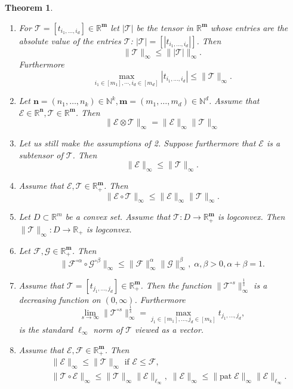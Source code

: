 \documentclass{amsart}
\newcommand{\N}{\mathbb{N}}
\newcommand{\R}{\mathbb{R}}
\newcommand{\m}{\mathbf{m}}
\newcommand{\n}{\mathbf{n}}
\newcommand{\0}{\mathbf{0}}
\newcommand{\1}{\mathbf{1}}
\newcommand{\cE}{\mathcal{E}}
\newcommand{\cF}{\mathcal{F}}
\newcommand{\cG}{\mathcal{G}}
\newcommand{\cT}{\mathcal{T}}
\newcommand{\pat}{\mathrm{pat}\;}
\newtheorem{theorem}[theo]{Theorem}
\theoremstyle{remark}
\numberwithin{equation}{section} %
\renewcommand{\le}{\leqslant}
\begin{document}
\begin{theorem}\label{logconspecnrm}   $\;$
\begin{enumerate}
\item For $\cT=[t_{i_1,\ldots,i_d}]\in\R^{\m}$ let $|\cT|$ be the tensor in $\R^{\m}$ whose entries are the absolute value of the entries $\cT$: $|\cT|=[|t_{i_1,\ldots,i_d}|]$.
Then
\begin{equation}\label{absdomin}
\|\cT\|_{\infty}\le \||\cT|\|_{\infty}.
\end{equation}
Furthermore
\begin{equation}\label{lowbndspecnrm}
\max_{i_1\in[m_1],\cdots,i_d\in[m_d]}|t_{i_1,\ldots,i_d}|\le \|\cT\|_{\infty}.
\end{equation}
\item Let $\n=(n_1,\ldots,n_k)\in\N^k, \m=(m_1,\ldots,m_d)\in\N^d$.  Assume that $\cE\in\R^{\n}, \cT\in\R^{\m}$.  Then
\begin{equation}\label{specnrmtenprod}
\|\cE\otimes \cT\|_{\infty}=\|\cE\|_{\infty}\|\cT\|_{\infty}
\end{equation}
\item Let us still make the assumptions of \emph{2}.  Suppose furthermore that $\cE$ is a subtensor of $\cT$.  
Then
\begin{equation}\label{subtenin}
\|\cE\|_{\infty}\le\|\cT\|_{\infty}.
\end{equation}
\item Assume that $\cE,\cT\in\R^{\m}_+$.  Then
\begin{equation}\label{hadprodin}
\|\cE\circ\cT\|_{\infty}\le \|\cE\|_{\infty}\|\cT\|_{\infty}.
\end{equation}
\item
Let $D\subset \R^m$ be a convex set.  Assume that $\cT:D\to \R_+^{\m}$ is logconvex.
 Then $\|\cT\|_{\infty}:D\to\R_+$ is logconvex.
\item Let $\cF,\cG\in\R_+^{\m}$.  Then
 \begin{equation}\label{genkinspecin}
 \|\cF^{\circ \alpha}\circ\cG^{\circ\beta}\|_{\infty}\le \|\cF\|_{\infty}^\alpha \|\cG\|_{\infty}^\beta,\; \alpha,\beta> 0, \alpha+\beta=1.
 \end{equation}
 \item Assume that $\cT=[t_{j_1,\ldots,j_d}]\in \R^{\m}_+$.  Then the function $\|\cT^{\circ s}\|_{\infty}^{\frac{1}{s}}$ is a decreasing function on $(0,\infty)$.
 Furthermore 
 \begin{equation}\label{limspecnrm}
 \lim_{s\to\infty} \|\cT^{\circ s}\|_{\infty}^{\frac{1}{s}}=\max_{j_1\in[m_1],\ldots,j_d\in[m_k]} t_{j_1,\ldots,j_d},
 \end{equation}
 is the standard $\ell_{\infty}$ norm of $\cT$ viewed as a vector.
 \item  Assume that $\cE,\cF\in\R^{\m}_+$.  Then
 \begin{eqnarray}\label{increspropspectnrm}
 &&\|\cE\|_{\infty}\le \|\cT\|_{\infty} \textrm{ if } \cE\le \cF,\\
 \label{ineqETtropnorm}
 &&\|\cT\circ\cE\|_{\infty}\le \|\cT\|_{\infty}\|\cE\|_{\ell_{\infty}}, \;
 \|\cE\|_{\infty}\le \|\pat \cE\|_{\infty}\|\cE\|_{\ell_{\infty}}.  
 \end{eqnarray}
 \end{enumerate}
\end{theorem}
\end{document}
